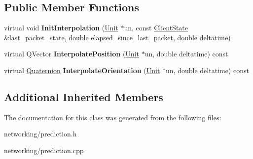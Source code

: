 \subsection*{Public Member Functions}
\begin{DoxyCompactItemize}
\item 
virtual void {\bfseries Init\+Interpolation} (\hyperlink{classUnit}{Unit} $\ast$un, const \hyperlink{classClientState}{Client\+State} \&last\+\_\+packet\+\_\+state, double elapsed\+\_\+since\+\_\+last\+\_\+packet, double deltatime)\hypertarget{classCubicSplinePrediction_a5ff09ed892c1e0715b2ebd52b5579a77}{}\label{classCubicSplinePrediction_a5ff09ed892c1e0715b2ebd52b5579a77}

\item 
virtual Q\+Vector {\bfseries Interpolate\+Position} (\hyperlink{classUnit}{Unit} $\ast$un, double deltatime) const \hypertarget{classCubicSplinePrediction_a626450f90a49587f8cd1b1aea725a73b}{}\label{classCubicSplinePrediction_a626450f90a49587f8cd1b1aea725a73b}

\item 
virtual \hyperlink{structQuaternion}{Quaternion} {\bfseries Interpolate\+Orientation} (\hyperlink{classUnit}{Unit} $\ast$un, double deltatime) const \hypertarget{classCubicSplinePrediction_a21ee4a68c0202248831c63b4df1cbcd4}{}\label{classCubicSplinePrediction_a21ee4a68c0202248831c63b4df1cbcd4}

\end{DoxyCompactItemize}
\subsection*{Additional Inherited Members}


The documentation for this class was generated from the following files\+:\begin{DoxyCompactItemize}
\item 
networking/prediction.\+h\item 
networking/prediction.\+cpp\end{DoxyCompactItemize}

